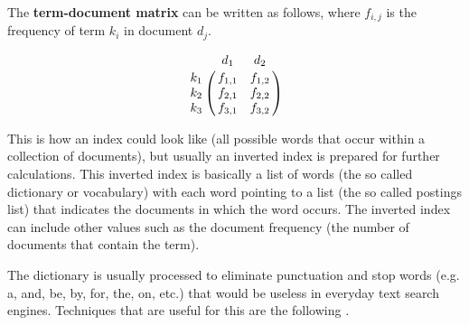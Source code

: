 
\\

The \textbf{term-document matrix} can be written as follows, where $f_{i,j}$ is the frequency of term $k_{i}$ in document $d_{j}$.

\begin{equation}
  \bbordermatrix{~ & d_1 & d_2 \cr
                k_1 & f_{1,1} & f_{1,2} \cr
                k_2 & f_{2,1} & f_{2,2} \cr
                k_3 & f_{3,1} & f_{3,2} \cr}
\label{eq:tdm}
\end{equation}


This is how an index could look like (all possible words that occur within a collection of documents), but usually an inverted index is prepared for further calculations. This inverted index is basically a list of words (the so called dictionary or vocabulary) with each word pointing to a list (the so called postings list) that indicates the documents in which the word occurs. The inverted index can include other values such as the document frequency (the number of documents that contain the term).

The dictionary is usually processed to eliminate punctuation and stop words (e.g. a, and, be, by, for, the, on, etc.) that would be useless in everyday text search engines. Techniques that are useful for this are the following \citep[Ch.2]{Manning2009}.

